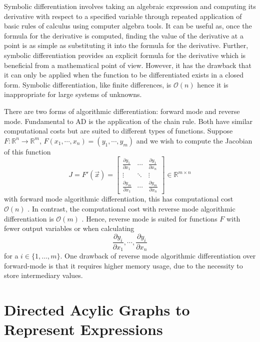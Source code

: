 \documentclass{article}
\begin{document}
Symbolic differentiation involves taking an algebraic expression and computing its derivative with respect to a specified variable through repeated application of basic rules of calculus using computer algebra tools. It can be useful as, once the formula for the derivative is computed, finding the value of the derivative at a point is as simple as substituting it into the formula for the derivative.  Further, symbolic differentiation provides an explicit formula for the derivative which is beneficial from a mathematical point of view. However, it has the drawback that it can only be applied when the function to be differentiated exists in a closed form. Symbolic differentiation, like finite differences, is $\mathcal{O}(n)$ \cite{chem} hence it is inappropriate for large systems of unknowns.

There are two forms of algorithmic differentiation: forward mode and reverse mode. Fundamental to AD is the application of the chain rule. Both have similar computational costs but are suited to different types of functions. Suppose $F: \mathbb{R}^n \rightarrow \mathbb{R}^m$, $F(x_1, \cdots, x_n) = (y_1, \cdots, y_m)$ and we wish to compute the Jacobian of this function
\begin{equation*}
    J = F'(\Vec{x}) = \begin{bmatrix}
        \frac{\partial y_1}{\partial x_1} & \cdots & \frac{\partial y_1}{\partial x_n} \\
        \vdots & \ddots & \vdots \\
        \frac{\partial y_m}{\partial x_1} & \cdots & \frac{\partial y_m}{\partial x_n}
    \end{bmatrix} \in \mathbb{R}^{m \times n}
\end{equation*}
with forward mode algorithmic differentiation, this has computational cost $\mathcal{O}(n)$ \cite{falisse}. In contrast, the computational cost with reverse mode algorithmic differentiation is $\mathcal{O}(m)$ \cite{falisse}. Hence, reverse mode is suited for functions $F$ with fewer output variables or when calculating 
\begin{equation*}
    \frac{\partial y_i}{\partial x_1}, \cdots, \frac{\partial y_i}{\partial x_n}
\end{equation*}
for a $i \in \{1, \dots, m \}$.
One drawback of reverse mode algorithmic differentiation over forward-mode is that it requires higher memory usage, due to the necessity to store intermediary values.

\section{Directed Acylic Graphs to Represent Expressions}
\end{document}
